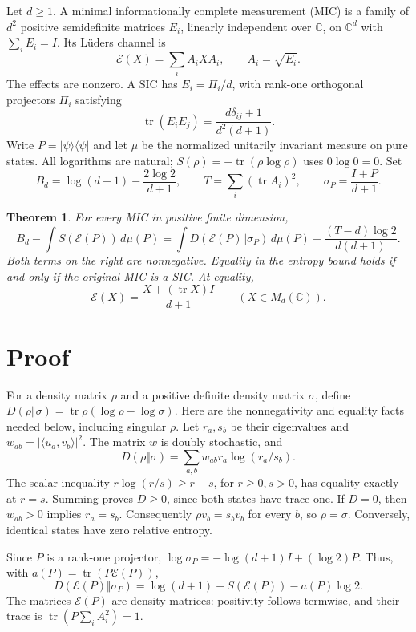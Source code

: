 \documentclass[11pt]{article}
\newtheorem{theorem}{Theorem}
\newcommand{\tr}{\operatorname{tr}}
\newcommand{\Id}{I}
\newcommand{\cE}{\mathcal E}
\begin{document}
Let $d\geq1$. A minimal informationally complete measurement (MIC) is a
family of $d^2$ positive semidefinite matrices $E_i$, linearly independent over $\mathbb C$,
on $\mathbb C^d$ with $\sum_iE_i=\Id$. Its L\"uders channel is
\[
 \cE(X)=\sum_i A_iXA_i,\qquad A_i=\sqrt{E_i}.
\]
The effects are nonzero. A SIC has $E_i=\Pi_i/d$, with rank-one
orthogonal projectors $\Pi_i$ satisfying
\begin{equation}\label{eq:sic}
 \tr(E_iE_j)=\frac{d\delta_{ij}+1}{d^2(d+1)}.
\end{equation}
Write $P=|\psi\rangle\langle\psi|$ and let $\mu$ be the normalized
unitarily invariant measure on pure states. All logarithms are natural;
$S(\rho)=-\tr(\rho\log\rho)$ uses $0\log0=0$. Set
\[
 B_d=\log(d+1)-\frac{2\log2}{d+1},\qquad
 T=\sum_i(\tr A_i)^2,\qquad \sigma_P=\frac{\Id+P}{d+1}.
\]

\begin{theorem}\label{thm:main}
For every MIC in positive finite dimension,
\begin{equation}\label{eq:gap}
 B_d-\int S(\cE(P))\,d\mu(P)
 =\int D(\cE(P)\Vert\sigma_P)\,d\mu(P)
   +\frac{(T-d)\log2}{d(d+1)}.
\end{equation}
Both terms on the right are nonnegative. Equality in the entropy bound
holds if and only if the original MIC is a SIC. At equality,
\begin{equation}\label{eq:depol}
 \cE(X)=\frac{X+(\tr X)\Id}{d+1}\qquad(X\in M_d(\mathbb C)).
\end{equation}
\end{theorem}

\section{Proof}
For a density matrix $\rho$ and a positive definite density matrix
$\sigma$, define $D(\rho\Vert\sigma)=\tr\rho(\log\rho-\log\sigma)$.
Here are the nonnegativity and equality facts needed below, including
singular $\rho$. Let $r_a,s_b$ be their eigenvalues and
$w_{ab}=|\langle u_a,v_b\rangle|^2$. The matrix $w$ is doubly
stochastic, and
\[
 D(\rho\Vert\sigma)=\sum_{a,b}w_{ab}r_a\log(r_a/s_b).
\]
The scalar inequality $r\log(r/s)\geq r-s$, for $r\geq0,s>0$,
has equality exactly at $r=s$. Summing proves $D\geq0$, since both
states have trace one. If $D=0$, then $w_{ab}>0$ implies $r_a=s_b$.
Consequently $\rho v_b=s_bv_b$ for every $b$, so $\rho=\sigma$.
Conversely, identical states have zero relative entropy.

Since $P$ is a rank-one projector,
$\log\sigma_P=-\log(d+1)\Id+(\log2)P$. Thus, with
$a(P)=\tr(P\cE(P))$,
\begin{equation}\label{eq:pointwise}
 D(\cE(P)\Vert\sigma_P)
   =\log(d+1)-S(\cE(P))-a(P)\log2.
\end{equation}
The matrices $\cE(P)$ are density matrices: positivity follows termwise,
and their trace is $\tr(P\sum_i A_i^2)=1$.
\end{document}
